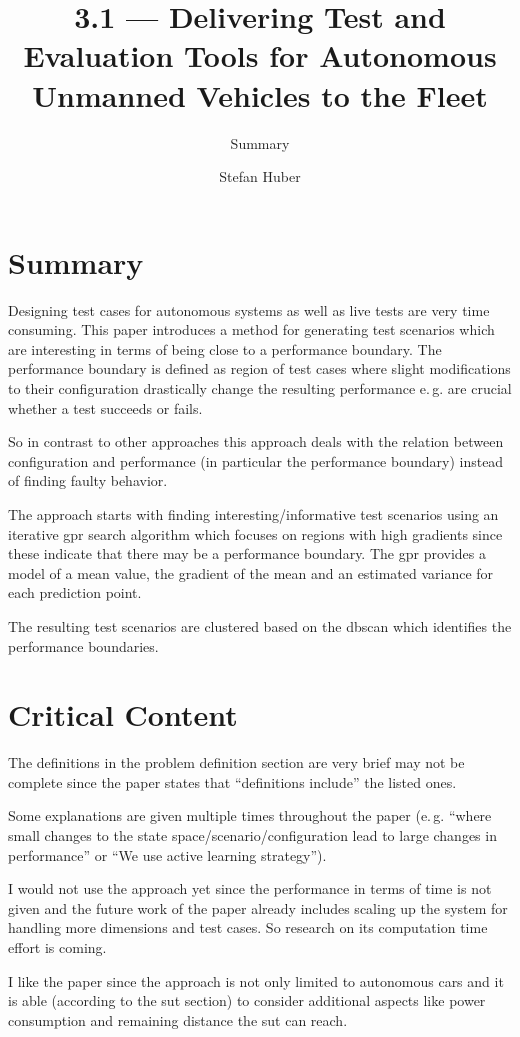 \documentclass[oneside, notitlepage, twocolumn]{scrartcl}
\title{\LARGE 3.1 --- Delivering Test and Evaluation Tools for Autonomous Unmanned Vehicles to the Fleet}
\subtitle{Summary}
\author{Stefan Huber}
\newcommand{\eg}{e.\,g.\xspace}
\begin{document}
\maketitle

\section{Summary}
Designing test cases for autonomous systems as well as live tests are very time consuming.
This paper introduces a method for generating test scenarios which are interesting in terms of being close to a performance boundary.
The performance boundary is defined as region of test cases where slight modifications to their configuration drastically change the resulting performance \eg{} are crucial whether a test succeeds or fails.\par
So in contrast to other approaches this approach deals with the relation between configuration and performance (in particular the performance boundary) instead of finding faulty behavior.\par
The approach starts with finding interesting/informative test scenarios using an iterative \gls{gpr} search algorithm which focuses on regions with high gradients since these indicate that there may be a performance boundary.
The \gls{gpr} provides a model of a mean value, the gradient of the mean and an estimated variance for each prediction point.\par
The resulting test scenarios are clustered based on the \gls{dbscan} which identifies the performance boundaries.

\section{Critical Content}
The definitions in the problem definition section are very brief may not be complete since the paper states that ``definitions include'' the listed ones.\par
Some explanations are given multiple times throughout the paper (\eg{} ``where small changes to the state space/scenario/configuration lead to large changes in performance'' or ``We use active learning strategy'').\par
I would not use the approach yet since the performance in terms of time is not given and the future work of the paper already includes scaling up the system for handling more dimensions and test cases.
So research on its computation time effort is coming.\par
I like the paper since the approach is not only limited to autonomous cars and it is able (according to the \gls{sut} section) to consider additional aspects like power consumption and remaining distance the \gls{sut} can reach.
\end{document}
